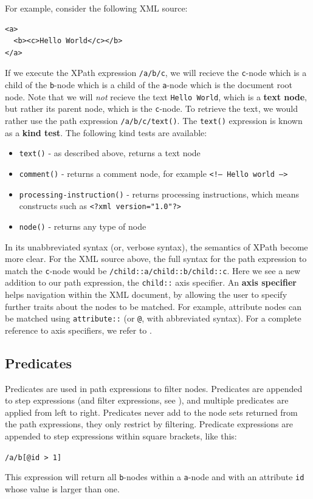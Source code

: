 For example, consider the following XML source:
\begin{center}
\begin{minipage}[h]{5.2cm}
\begin{verbatim}
<a>
  <b><c>Hello World</c></b>
</a>
\end{verbatim}
\end{minipage}
\end{center}
If we execute the XPath expression \verb!/a/b/c!, we will recieve the
\verb!c!-node which is a child of the \verb!b!-node which is a child of the
\verb!a!-node which is the document root node. Note that we will \textit{not}
recieve the text \texttt{Hello World}, which is a \textbf{text node}, but rather its
parent node, which is the \verb!c!-node. To retrieve the text, we would rather
use the path expression \verb!/a/b/c/text()!. The  \verb!text()! expression is
known as a \textbf{kind test}. The following kind tests are available:
\begin{itemize}
  \item \verb!text()! - as described above, returns a text node
  \item \verb!comment()! - returns a comment node, for example \texttt{<!-- Hello
  world -->}
  \item \verb!processing-instruction()! - returns processing instructions, which
  means constructs such as \texttt{<?xml version="1.0"?>}
  \item \verb!node()! - returns any type of node 
\end{itemize} 

In its unabbreviated syntax (or, verbose syntax), the semantics of XPath
become more clear. For the XML source above, the full syntax for the path
expression to match the \verb!c!-node would be
\texttt{/child::a/child::b/child::c}. Here we see a new addition to our path
expression, the \verb!child::! axis specifier. An \textbf{axis specifier} helps
navigation within the XML document, by allowing the user to specify further
traits about the nodes to be matched. For example, attribute nodes can be
matched using \verb!attribute::! (or \verb!@!, with abbreviated syntax). For a
complete reference to axis specifiers, we refer to \cite{w3c01}.

\subsection{Predicates}
\label{sect:theory:xquery:Predicates}
Predicates are used in path expressions to filter nodes. Predicates are
appended to step expressions (and filter expressions, see \cite{w3c01}), and multiple predicates
are applied from left to right. Predicates never add to the node sets returned from the path expressions, they
only restrict by filtering. Predicate expressions are appended to step expressions within square brackets, like
this:
\begin{center}
\verb!/a/b[@id > 1]!
\end{center} 
This expression will return all \verb!b!-nodes within a \verb!a!-node and with an attribute \verb!id! whose value
is larger than one.

